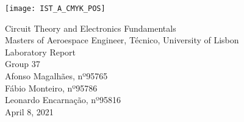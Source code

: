 
\thispagestyle {empty}

\texttt{[image: IST\_A\_CMYK\_POS]}

\begin{center}
%
\vspace{1.0cm}
\vspace{1cm}
{\FontLb Circuit Theory and Electronics Fundamentals} \\
\vspace{1cm}
{\FontSn Masters of Aeroespace Engineer, Técnico, University of Lisbon} \\ 
\vspace{1cm}
{\FontSn Laboratory Report} \\
\vspace{5mm}
{\FontSn Group 37} \\
\vspace{1cm}
{\FontSn Afonso Magalhães, nº95765}\\ 
{\FontSn Fábio Monteiro, nº95786}\\
{\FontSn Leonardo Encarnação, nº95816}\\
\vspace{14cm}
{\FontSn April 8, 2021}  
\end{center}

\newpage

